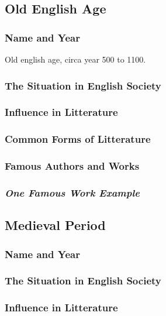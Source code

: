 \subsection{Old English Age}

\subsubsection{Name and Year}
Old english age, circa year 500 to 1100.

\subsubsection{The Situation in English Society}


\subsubsection{Influence in Litterature}

\subsubsection{Common Forms of Litterature}

\subsubsection{Famous Authors and Works}

\subsubsection{\textit{One Famous Work Example}}

\newpage
\subsection{Medieval Period}

\subsubsection{Name and Year}

\subsubsection{The Situation in English Society}

\subsubsection{Influence in Litterature}

